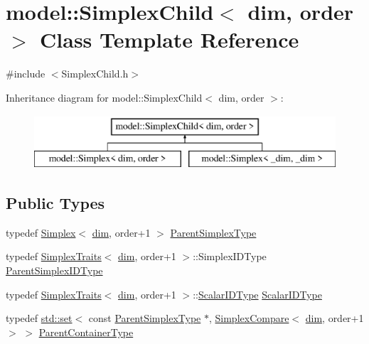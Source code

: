 \hypertarget{classmodel_1_1_simplex_child}{}\section{model\+:\+:Simplex\+Child$<$ dim, order $>$ Class Template Reference}
\label{classmodel_1_1_simplex_child}


{\ttfamily \#include $<$Simplex\+Child.\+h$>$}

Inheritance diagram for model\+:\+:Simplex\+Child$<$ dim, order $>$\+:\begin{figure}[H]
\begin{center}
\leavevmode
\includegraphics[height=2.000000cm]{classmodel_1_1_simplex_child}
\end{center}
\end{figure}
\subsection*{Public Types}
\begin{DoxyCompactItemize}
\item 
typedef \hyperlink{classmodel_1_1_simplex}{Simplex}$<$ \hyperlink{plot_nd_a_8m_a382f3ca768b275b8d563604f7fc7df73}{dim}, order+1 $>$ \hyperlink{classmodel_1_1_simplex_child_aa1c2795f491c9cd9dc6edd46acc9850c}{Parent\+Simplex\+Type}
\item 
typedef \hyperlink{structmodel_1_1_simplex_traits}{Simplex\+Traits}$<$ \hyperlink{plot_nd_a_8m_a382f3ca768b275b8d563604f7fc7df73}{dim}, order+1 $>$\+::Simplex\+I\+D\+Type \hyperlink{classmodel_1_1_simplex_child_a7336897dae37e33597d636c48fef61d7}{Parent\+Simplex\+I\+D\+Type}
\item 
typedef \hyperlink{structmodel_1_1_simplex_traits}{Simplex\+Traits}$<$ \hyperlink{plot_nd_a_8m_a382f3ca768b275b8d563604f7fc7df73}{dim}, order+1 $>$\+::\hyperlink{classmodel_1_1_simplex_child_abdb415921c164d40dc0f838a77ff39c4}{Scalar\+I\+D\+Type} \hyperlink{classmodel_1_1_simplex_child_abdb415921c164d40dc0f838a77ff39c4}{Scalar\+I\+D\+Type}
\item 
typedef \hyperlink{plot_cells_8m_a03623d69001c34fc77654be29bdc3d8a}{std\+::set}$<$ const \hyperlink{classmodel_1_1_simplex_child_aa1c2795f491c9cd9dc6edd46acc9850c}{Parent\+Simplex\+Type} $\ast$, \hyperlink{structmodel_1_1_simplex_compare}{Simplex\+Compare}$<$ \hyperlink{plot_nd_a_8m_a382f3ca768b275b8d563604f7fc7df73}{dim}, order+1 $>$ $>$ \hyperlink{classmodel_1_1_simplex_child_aad7e4820d7c2450bbf9c328ba68d2bd7}{Parent\+Container\+Type}
\end{DoxyCompactItemize}
